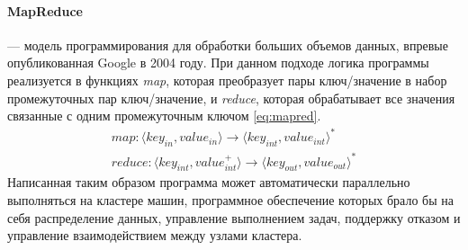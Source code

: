 \paragraph{MapReduce} --- модель программирования для обработки больших объемов данных, впревые опубликованная\cite{googlemr} Google в 2004 году. При данном подходе логика программы реализуется в функциях \textit{map}, которая преобразует пары ключ/значение в набор промежуточных пар ключ/значение, и \textit{reduce}, которая обрабатывает все значения связанные с одним промежуточным ключом \ref{eq:mapred}.
\begin{equation}\label{eq:mapred}
\begin{split}
map:\langle key_{in}, value_{in}\rangle\rightarrow\langle key_{int}, value_{int}\rangle^{*} \\
reduce:\langle key_{int}, value_{int}^{+}\rangle\rightarrow\langle key_{out}, value_{out}\rangle^{*}
\end{split}
\end{equation}
Написанная таким образом программа может автоматически параллельно выполняться на кластере машин, программное обеспечение которых брало бы на себя распределение данных, управление выполнением задач, поддержку отказом и управление взаимодействием между узлами кластера. 

